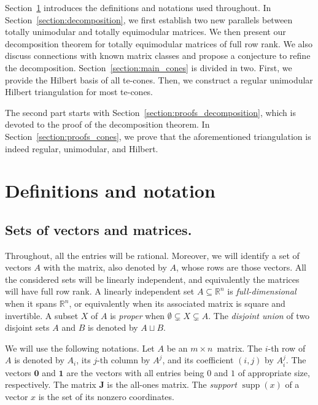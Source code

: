 \documentclass[11pt,a4paper]{amsart}
\theoremstyle{plain}
\theoremstyle{definition}
\newcommand{\R}{\mathbb{R}}
\DeclareMathOperator{\supp}{supp}
\begin{document}
Section~\ref{section:def} introduces the definitions and notations used throughout. 
In Section~\ref{section:decomposition}, we first establish two new parallels between totally unimodular and totally equimodular matrices.
We then present our decomposition theorem for totally equimodular matrices of full row rank.
We also discuss connections with known matrix classes and propose a conjecture to refine the decomposition. 
Section~\ref{section:main_cones} is divided in two.
First, we provide the Hilbert basis of all te-cones.
Then, we construct a regular unimodular Hilbert triangulation for most te-cones.

The second part starts with Section~\ref{section:proofs_decomposition}, which is devoted to the proof of the decomposition theorem.
In Section~\ref{section:proofs_cones}, we prove that the aforementioned triangulation is indeed regular, unimodular, and Hilbert.

\section{Definitions and notation}\label{section:def}

\subsection{Sets of vectors and matrices.}

Throughout, all the entries will be rational.
Moreover, we will identify a set of vectors $A$ with the matrix, also denoted by $A$, whose rows are those vectors.
All the considered sets will be linearly independent, and equivalently the matrices will have full row rank.
A linearly independent set $A\subseteq \R^n$ is \emph{full-dimensional} when it spans $\R^n$, or equivalently when its associated matrix is square and invertible.	
A subset $X$ of $A$ is \emph{proper} when $\emptyset\subsetneq  X\subsetneq  A$.
The \emph{disjoint union} of two disjoint sets $A$ and $B$ is denoted by $A\sqcup B$.

We will use the following notations.
Let $A$ be an $m\times n$~matrix.
The $i$-th row of $A$ is denoted by $A_i$, its $j$-th column by $A^j$, and its coefficient $(i,j)$ by $A_i^j$.
The vectors $\mathbf{0}$ and $\mathbf{1}$ are the vectors with all entries being $0$ and $1$ of appropriate size, respectively.
The matrix $\mathbf{J}$ is the all-ones matrix.
The \emph{support} $\supp (x)$ of a vector $x$ is the set of its nonzero coordinates.
\end{document}
